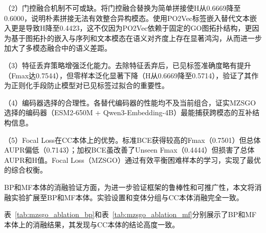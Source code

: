 （2）门控融合机制不可或缺。将门控融合替换为简单拼接使H从0.6669降至0.6000，说明朴素拼接无法有效整合异构模态。使用PO2Vec标签嵌入替代文本嵌入更是导致H降至0.4423，这不仅因为PO2Vec依赖于固定的GO图拓扑结构，更因为基于图拓扑的嵌入与序列和文本模态在语义对齐度上存在显著鸿沟，从而进一步加大了多模态融合中的语义差距。

（3）特征丢弃策略增强泛化能力。去除特征丢弃后，已见标签准确度略有提升（Fmax达0.7544），但零样本泛化显著下降（H从0.6669降至0.5714），验证了其作为正则化手段防止模型对已见标签过拟合\cite{srivastava2014dropout}的重要性。

（4）编码器选择的合理性。各替代编码器的性能均不及当前组合，证实MZSGO选择的编码器（ESM2-650M + Qwen3-Embedding-4B）最能捕获跨模态的互补结构信息。

（5）Focal Loss在CC本体上的优势。标准BCE获得较高的Fmax（0.7501）但总体AUPR偏低（0.7143）；加权BCE虽改善了Unseen Fmax（0.4444）但损害了总体AUPR和H值。Focal Loss（MZSGO）通过有效平衡困难样本的学习，实现了最优的综合权衡。

BP和MF本体的消融验证方面，为进一步验证框架的鲁棒性和可推广性，本文将消融实验扩展至BP和MF本体。实验设置和变体分组与CC本体消融完全一致。

表~\ref{tab:mzsgo_ablation_bp}和表~\ref{tab:mzsgo_ablation_mf}分别展示了BP和MF本体上的消融结果，其发现与CC本体的结论高度一致。

